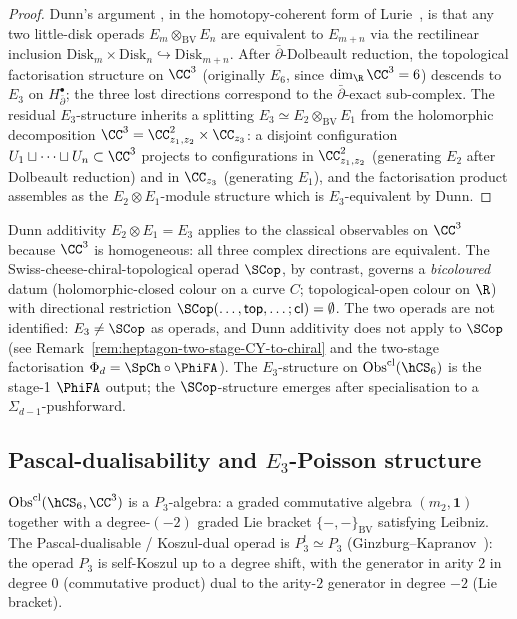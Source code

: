 \begin{proof}
Dunn's argument \cite{Dunn88}, in the homotopy-coherent form of
Lurie~\cite[\S 5.1.2]{HA}, is that any two little-disk operads
$E_m\otimes_{\mathrm{BV}} E_n$ are equivalent to $E_{m+n}$ via the
rectilinear inclusion $\mathrm{Disk}_m\times \mathrm{Disk}_n
\hookrightarrow \mathrm{Disk}_{m+n}$. After $\bar\partial$-Dolbeault
reduction, the topological factorisation structure on $\CC^3$
(originally $E_6$, since $\dim_\R\CC^3=6$) descends to $E_3$ on
$H^\bullet_{\bar\partial}$; the three lost directions correspond to
the $\bar\partial$-exact sub-complex. The residual $E_3$-structure
inherits a splitting $E_3\simeq E_2\otimes_{\mathrm{BV}} E_1$ from
the holomorphic decomposition $\CC^3 = \CC^2_{z_1,z_2}\times\CC_{z_3}$:
a disjoint configuration $U_1\sqcup\cdots\sqcup U_n \subset \CC^3$
projects to configurations in $\CC^2_{z_1,z_2}$ (generating $E_2$
after Dolbeault reduction) and in $\CC_{z_3}$ (generating $E_1$),
and the factorisation product assembles as the $E_2\otimes E_1$-module
structure which is $E_3$-equivalent by Dunn.
\end{proof}

\begin{remark}
\label{rem:sc-not-dunn}
Dunn additivity $E_2\otimes E_1 = E_3$ applies to the classical
observables on $\CC^3$ because $\CC^3$ is homogeneous: all three
complex directions are equivalent. The Swiss-cheese-chiral-topological
operad $\SCop$, by contrast, governs a \emph{bicoloured} datum
(holomorphic-closed colour on a curve $C$; topological-open colour on
$\R$) with directional restriction
$\SCop(\ldots,\mathsf{top},\ldots;\mathsf{cl}) = \emptyset$. The two
operads are not identified: $E_3 \neq \SCop$ as
operads, and Dunn additivity does not apply to $\SCop$
(see Remark~\ref{rem:heptagon-two-stage-CY-to-chiral} and the
two-stage factorisation $\Phi_d = \SpCh \circ \PhiFA$). The
$E_3$-structure on $\mathrm{Obs}^{\mathrm{cl}}(\hCS_6)$ is the
stage-1 $\PhiFA$ output; the $\SCop$-structure emerges after
specialisation to a $\Sigma_{d-1}$-pushforward.
\end{remark}

\subsection{Pascal-dualisability and $E_3$-Poisson structure}
\label{subsec:E3-pascal}

\begin{theorem}
\label{thm:P3-obs-6d-hCS}
$\mathrm{Obs}^{\mathrm{cl}}(\hCS_6,\CC^3)$ is a $P_3$-algebra:
a graded commutative algebra $(m_2, \mathbf{1})$ together with a
degree-$(-2)$ graded Lie bracket $\{-,-\}_{\mathrm{BV}}$
satisfying Leibniz. The Pascal-dualisable / Koszul-dual operad is
$P_3^!\simeq P_3$ (Ginzburg--Kapranov~\cite{GK94}): the operad
$P_3$ is self-Koszul up to a degree shift, with the generator in arity
$2$ in degree $0$ (commutative product) dual to the arity-$2$ generator
in degree $-2$ (Lie bracket).
\end{theorem}

